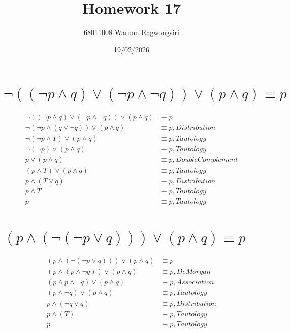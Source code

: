\documentclass{article}
\title{Homework 17}
\author{68011008 Waroon Ragwongsiri}
\date{19/02/2026}
\begin{document}
\maketitle

{\small
\section{$\neg ((\neg p \land q) \lor (\neg p \land \neg q)) \lor (p \land q) \equiv p$}
}
\begin{align}
	\neg ((\neg p \land q) \lor (\neg p \land \neg q)) \lor (p \land q) &\equiv p \\
	\neg (\neg p \land (q \lor \neg q)) \lor (p \land q) &\equiv p, Distribution \\
	\neg (\neg p \land T) \lor (p \land q) &\equiv p, Tautology \\
	\neg (\neg p) \lor (p \land q) &\equiv p, Tautology \\
	p \lor (p \land q) &\equiv p, Double Complement \\
	(p \land T) \lor (p \land q) &\equiv p, Tautology \\
	p \land (T \lor q) &\equiv p, Distribution \\
	p \land T &\equiv p, Tautology \\
	p &\equiv p, Tautology
\end{align}

\break

{\small
\section{$(p \land (\neg (\neg p \lor q))) \lor (p \land q) \equiv p$}
}
\begin{align}
	(p \land (\neg (\neg p \lor q))) \lor (p \land q) &\equiv p \\
	(p \land (p \land \neg q)) \lor (p \land q) &\equiv p, De Morgan \\
	(p \land p \land \neg q) \lor (p \land q) &\equiv p, Association \\
	(p \land \neg q) \lor (p \land q) &\equiv p, Tautology \\
	p \land (\neg q \lor q) &\equiv p, Distribution \\
	p \land (T) &\equiv p, Tautology \\
	p &\equiv p, Tautology
\end{align}
\end{document}
